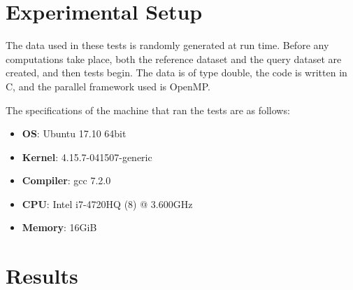 \documentclass[a4paper,twoside,11pt]{report}
\begin{document}
\hrulefill
{}
\section*{Experimental Setup}

The data used in these tests is randomly generated at run time. Before any computations take place, both the reference dataset and the query dataset are created, and then tests begin. The data is of type double, the code is written in C, and the parallel framework used is OpenMP.

The specifications of the machine that ran the tests are as follows:
\begin{itemize}
	\item \textbf{OS}: Ubuntu 17.10 64bit
	\item \textbf{Kernel}: 4.15.7-041507-generic
	\item \textbf{Compiler}: gcc 7.2.0
	\item \textbf{CPU}: Intel i7-4720HQ (8) @ 3.600GHz
	\item \textbf{Memory}: 16GiB
\end{itemize}

\hrulefill
{}
\section*{Results}



\newpage

\end{document}
